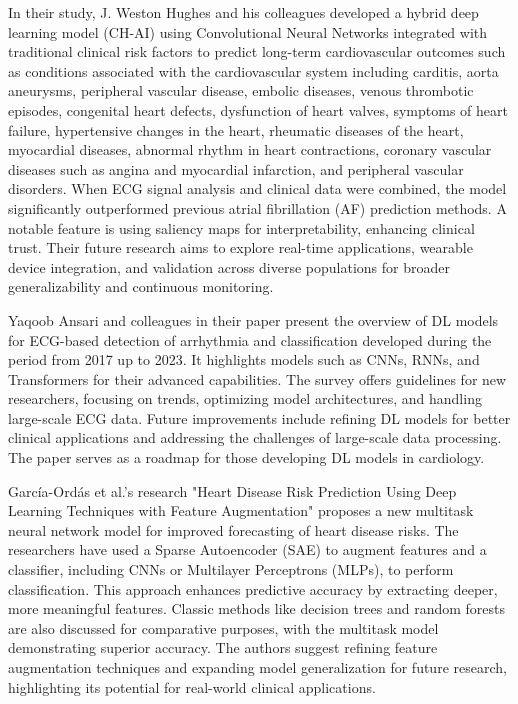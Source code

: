 In their study, J. Weston Hughes and his colleagues developed a hybrid deep learning model (CH-AI) using Convolutional Neural Networks integrated with traditional clinical risk factors to predict long-term cardiovascular outcomes such as conditions associated with the cardiovascular system including carditis, aorta aneurysms, peripheral vascular disease, embolic diseases, venous thrombotic episodes, congenital heart defects, dysfunction of heart valves, symptoms of heart failure, hypertensive changes in the heart, rheumatic diseases of the heart, myocardial diseases, abnormal rhythm in heart contractions, coronary vascular diseases such as angina and myocardial infarction, and peripheral vascular disorders. When ECG signal analysis and clinical data were combined, the model significantly outperformed previous atrial fibrillation (AF) prediction methods. A notable feature is using saliency maps for interpretability, enhancing clinical trust. Their future research aims to explore real-time applications, wearable device integration, and validation across diverse populations for broader generalizability and continuous monitoring.
\vspace{0.5cm}

Yaqoob Ansari and colleagues in their paper present the overview of DL models for ECG-based detection of arrhythmia and classification developed during the period from 2017 up to 2023. It highlights models such as CNNs, RNNs, and Transformers for their advanced capabilities. The survey offers guidelines for new researchers, focusing on trends, optimizing model architectures, and handling large-scale ECG data. Future improvements include refining DL models for better clinical applications and addressing the challenges of large-scale data processing. The paper serves as a roadmap for those developing DL models in cardiology.
\vspace{0.5cm}


García-Ordás et al.'s research "Heart Disease Risk Prediction Using Deep Learning Techniques with Feature Augmentation" proposes a new multitask neural network model for improved forecasting of heart disease risks. The researchers have used a Sparse Autoencoder (SAE) to augment features and a classifier, including CNNs or Multilayer Perceptrons (MLPs), to perform classification. This approach enhances predictive accuracy by extracting deeper, more meaningful features. Classic methods like decision trees and random forests are also discussed for comparative purposes, with the multitask model demonstrating superior accuracy. The authors suggest refining feature augmentation techniques and expanding model generalization for future research, highlighting its potential for real-world clinical applications.
\vspace{0.5cm}

